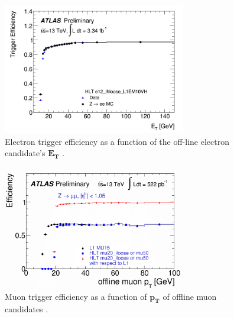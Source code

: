 \begin{figure}[h]
     \centering
        \captionsetup{width=0.7\textwidth}
        \includegraphics[width=8cm]{Appendices/Et_e12_lhloose_L1EM10VH}
        \caption{Electron trigger efficiency as a function of the off-line electron candidate’s $\mathbf{E_T}$ \citep{eltrig}.}
        \label{fig:eltrig}
\end{figure}%
\begin{figure}[h]
     \centering
        \captionsetup{width=0.7\textwidth}
        \includegraphics[width=8cm]{Appendices/LHCC_HLT_mu20_iloose_L1MU15_OR_HLT_mu50_barrel_probe_pt_eff}
        \caption{Muon trigger efficiency as a function of $\mathbf{p_T}$ of offline muon candidates \citep{muontrig}.}  
        \label{fig:mutrig}   
\end{figure}
